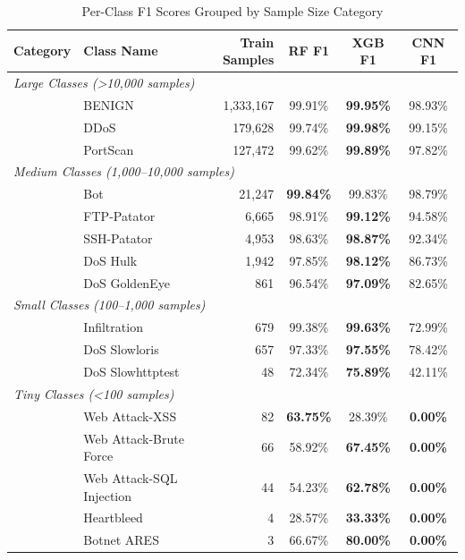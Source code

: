 \documentclass[10pt,twocolumn]{article}
\begin{document}
\begin{table}[t]
\caption{Per-Class F1 Scores Grouped by Sample Size Category}
\label{tab:perclass}
\centering
\small
\begin{tabular}{llrccc}
\toprule
\textbf{Category} & \textbf{Class Name} & \textbf{Train Samples} & \textbf{RF F1} & \textbf{XGB F1} & \textbf{CNN F1} \\
\midrule
\multicolumn{6}{l}{\textit{Large Classes (>10,000 samples)}} \\
& BENIGN & 1,333,167 & 99.91\% & \textbf{99.95\%} & 98.93\% \\
& DDoS & 179,628 & 99.74\% & \textbf{99.98\%} & 99.15\% \\
& PortScan & 127,472 & 99.62\% & \textbf{99.89\%} & 97.82\% \\
\midrule
\multicolumn{6}{l}{\textit{Medium Classes (1,000--10,000 samples)}} \\
& Bot & 21,247 & \textbf{99.84\%} & 99.83\% & 98.79\% \\
& FTP-Patator & 6,665 & 98.91\% & \textbf{99.12\%} & 94.58\% \\
& SSH-Patator & 4,953 & 98.63\% & \textbf{98.87\%} & 92.34\% \\
& DoS Hulk & 1,942 & 97.85\% & \textbf{98.12\%} & 86.73\% \\
& DoS GoldenEye & 861 & 96.54\% & \textbf{97.09\%} & 82.65\% \\
\midrule
\multicolumn{6}{l}{\textit{Small Classes (100--1,000 samples)}} \\
& Infiltration & 679 & 99.38\% & \textbf{99.63\%} & 72.99\% \\
& DoS Slowloris & 657 & 97.33\% & \textbf{97.55\%} & 78.42\% \\
& DoS Slowhttptest & 48 & 72.34\% & \textbf{75.89\%} & 42.11\% \\
\midrule
\multicolumn{6}{l}{\textit{Tiny Classes (<100 samples)}} \\
& Web Attack-XSS & 82 & \textbf{63.75\%} & 28.39\% & \textbf{0.00\%} \\
& Web Attack-Brute Force & 66 & 58.92\% & \textbf{67.45\%} & \textbf{0.00\%} \\
& Web Attack-SQL Injection & 44 & 54.23\% & \textbf{62.78\%} & \textbf{0.00\%} \\
& Heartbleed & 4 & 28.57\% & \textbf{33.33\%} & \textbf{0.00\%} \\
& Botnet ARES & 3 & 66.67\% & \textbf{80.00\%} & \textbf{0.00\%} \\
\bottomrule
\end{tabular}
\end{table}
\end{document}
